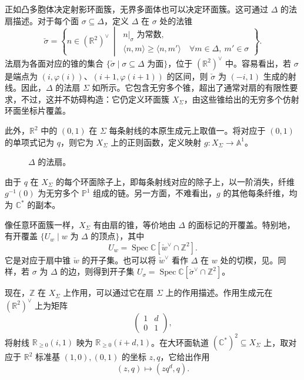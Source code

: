 正如凸多胞体决定射影环面簇，无界多面体也可以决定环面簇。这可通过 $\Delta$ 的法扇描述。对于每个面 $\sigma\subseteq\Delta$，定义 $\Delta$ 在 $\sigma$ 处的法锥
\[
\check\sigma=\left\{n\in(\mathbb R^2)^\vee\ \middle|\
\begin{gathered}
n|_\sigma\text{ 为常数},\\
\langle n,m\rangle\geq\langle n,m'\rangle
\quad\forall m\in\Delta,\ m'\in\sigma
\end{gathered}\right\}.
\]
法扇为各面对应的锥的集合 $\{\check\sigma\mid\sigma\subseteq\Delta\text{ 为面}\}$，位于 $(\mathbb R^2)^\vee$ 中。容易看出，若 $\sigma$ 是端点为 $(i,\varphi(i))$、$(i+1,\varphi(i+1))$ 的区间，则 $\check\sigma$ 为 $(-i,1)$ 生成的射线。因此，$\Delta$ 的法扇 $\Sigma$ 如所示。它包含无穷多个锥，超出了通常对扇的有限性要求，不过，这并不妨碍构造：它仍定义环面簇 $X_\Sigma$，由这些锥给出的无穷多个仿射环面坐标片覆盖。

此外，$\mathbb R^2$ 中的 $(0,1)$ 在 $\Sigma$ 每条射线的本原生成元上取值一。将对应于 $(0,1)$ 的单项式记为 $q$，则它为 $X_\Sigma$ 上的正则函数，定义映射 $g\colon X_\Sigma\to\mathbb A^1$。
\begin{figure}[H]
\centering
{}
\caption{$\Delta$ 的法扇。}\label{fig:8.25}
\end{figure}

由于 $q$ 在 $X_\Sigma$ 的每个环面除子上，即每条射线对应的除子上，以一阶消失，纤维 $g^{-1}(0)$ 为无穷多个 $\mathbb P^1$ 组成的链。另一方面，不难看出，$g$ 的其他每条纤维，均为 $\mathbb C^*$ 的副本。

像任意环面簇一样，$X_\Sigma$ 有由扇的锥，等价地由 $\Delta$ 的面标记的开覆盖。特别地，有开覆盖 $\{U_w\mid w\text{ 为 }\Delta\text{ 的顶点}\}$，其中
\[
U_w=\operatorname{Spec}\mathbb C[\check w^\vee\cap\mathbb Z^2].
\]
它是对应于扇中锥 $\check w$ 的开子集。也可以将 $\check w^\vee$ 看作 $\Delta$ 在 $w$ 处的切楔，见。同样，若 $\sigma$ 为 $\Delta$ 的边，则得到开子集 $U_\sigma=\operatorname{Spec}\mathbb C[\check\sigma^\vee\cap\mathbb Z^2]$。
\begin{figure}[H]
\centering
{}
\BookNumberOnlyCaption\label{fig:8.26}
\end{figure}

现在，$\mathbb Z$ 在 $X_\Sigma$ 上作用，可以通过它在扇 $\Sigma$ 上的作用描述。作用生成元在 $(\mathbb R^2)^\vee$ 上为矩阵
\[
\begin{pmatrix}1&d\\0&1\end{pmatrix},
\]
将射线 $\mathbb R_{\geq0}(i,1)$ 映为 $\mathbb R_{\geq0}(i+d,1)$。在大环面轨道 $(\mathbb C^*)^2\subseteq X_\Sigma$ 上，取对应于 $\mathbb R^2$ 标准基 $(1,0),(0,1)$ 的坐标 $z,q$，它给出作用
\[
(z,q)\longmapsto(zq^d,q).
\]

